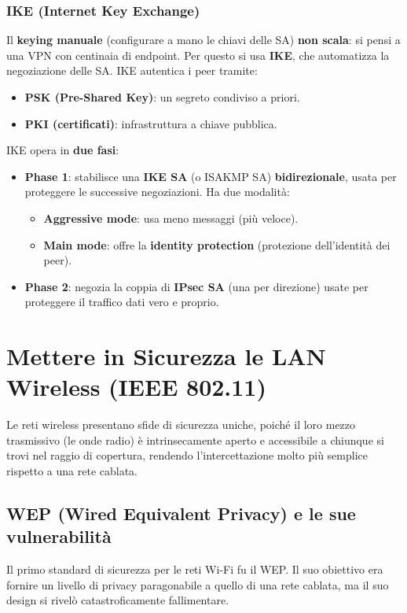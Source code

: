 \subsubsection{IKE (Internet Key Exchange)}
Il \textbf{keying manuale} (configurare a mano le chiavi delle SA) \textbf{non scala}: si pensi a una VPN con centinaia di endpoint. Per questo si usa \textbf{IKE}, che automatizza la negoziazione delle SA. IKE autentica i peer tramite:
\begin{itemize}
    \item \textbf{PSK (Pre-Shared Key)}: un segreto condiviso a priori.
    \item \textbf{PKI (certificati)}: infrastruttura a chiave pubblica.
\end{itemize}
IKE opera in \textbf{due fasi}:
\begin{itemize}
    \item \textbf{Phase 1}: stabilisce una \textbf{IKE SA} (o ISAKMP SA) \textbf{bidirezionale}, usata per proteggere le successive negoziazioni. Ha due modalità:
    \begin{itemize}
        \item \textbf{Aggressive mode}: usa meno messaggi (più veloce).
        \item \textbf{Main mode}: offre la \textbf{identity protection} (protezione dell'identità dei peer).
    \end{itemize}
    \item \textbf{Phase 2}: negozia la coppia di \textbf{IPsec SA} (una per direzione) usate per proteggere il traffico dati vero e proprio.
\end{itemize}
\section{Mettere in Sicurezza le LAN Wireless (IEEE 802.11)}
Le reti wireless presentano sfide di sicurezza uniche, poiché il loro mezzo trasmissivo (le onde radio) è intrinsecamente aperto e accessibile a chiunque si trovi nel raggio di copertura, rendendo l'intercettazione molto più semplice rispetto a una rete cablata.

\subsection{WEP (Wired Equivalent Privacy) e le sue vulnerabilità}
Il primo standard di sicurezza per le reti Wi-Fi fu il WEP. Il suo obiettivo era fornire un livello di privacy paragonabile a quello di una rete cablata, ma il suo design si rivelò catastroficamente fallimentare.

